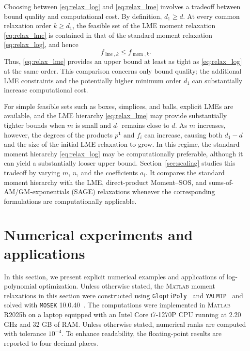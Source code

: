 \documentclass[pdflatex,sn-mathphys-num]{sn-jnl}%
\theoremstyle{thmstyleone}%
\theoremstyle{thmstyletwo}%
\theoremstyle{thmstylethree}%
\begin{document}
{\color{red}
Choosing between \eqref{eq:relax_log} and
\eqref{eq:relax_lme} involves a tradeoff between bound quality and
computational cost. By definition, $d_1\geq d$. At every common
relaxation order $k\geq d_1$, the feasible set of the LME moment
relaxation \eqref{eq:relax_lme} is contained in that of the standard
moment relaxation \eqref{eq:relax_log}, and hence
\[
f_{\operatorname{lme},k}
\leq
f_{\operatorname{mom},k}.
\]
Thus, \eqref{eq:relax_lme} provides an upper bound at least as tight as
\eqref{eq:relax_log} at the same order. This comparison concerns only
bound quality; the additional LME constraints and the potentially
higher minimum order $d_1$ can substantially increase computational
cost.

For simple feasible sets such as boxes, simplices, and balls, explicit
LMEs are available, and the LME hierarchy \eqref{eq:relax_lme}
may provide substantially tighter bounds when $m$ is small and
$d_1$ remains close to $d$. As $m$
increases, however, the degrees of the products $p^{\mathbf{1}}$ and
$f_i$ can increase, causing both $d_1-d$ and the size of the initial
LME relaxation to grow. In this regime, the standard moment hierarchy
\eqref{eq:relax_log} may be computationally preferable, although it can
yield a substantially looser upper bound. Section~\ref{sec:scaling}
studies this tradeoff by varying $m$, $n$, and the coefficients
$a_i$. It compares the standard moment hierarchy with the LME,
direct-product Moment--SOS, and sums-of-AM/GM-exponentials (SAGE)
relaxations whenever the corresponding formulations are computationally
applicable.
}



\section{Numerical experiments and applications}
\label{sec:exp}


In this section, we present explicit numerical examples 
and applications of log-polynomial optimization.
Unless otherwise stated, the \textsc{Matlab} moment relaxations in
this section were constructed using
\texttt{GloptiPoly}~\cite{GloptiPoly} and
\texttt{YALMIP}~\cite{Yalmip} and solved with
\texttt{MOSEK} 10.0.40~\cite{mosek}.
The computations were implemented in \textsc{Matlab} R2025b on a
laptop equipped with an Intel Core i7-1270P CPU running at
2.20 GHz and 32 GB of RAM.
Unless otherwise stated, numerical ranks are computed with
tolerance $10^{-4}$.
To enhance readability, the floating-point results are reported to
four decimal places.
\end{document}
